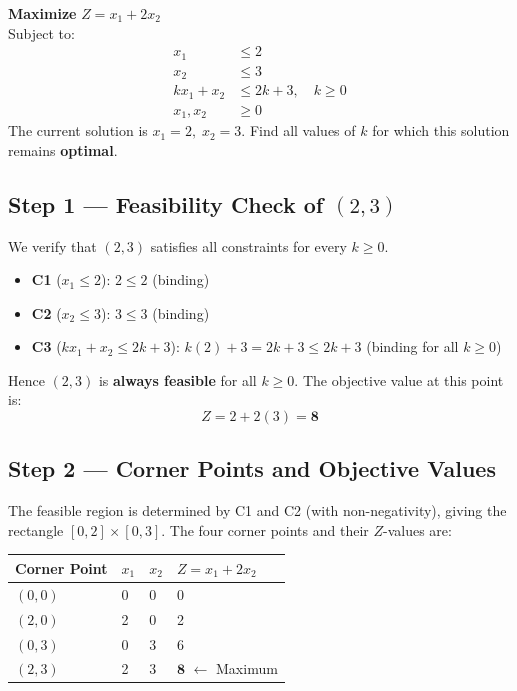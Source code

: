 \documentclass[12pt]{article}
\newcommand{\hcell}[1]{\textbf{\color{white}#1}}
\begin{document}
\begin{problembox}
\textbf{Maximize} $Z = x_1 + 2x_2$\\[4pt]
Subject to:
\begin{align*}
  x_1 &\leq 2 \tag{C1}\\
  x_2 &\leq 3 \tag{C2}\\
  kx_1 + x_2 &\leq 2k + 3, \quad k \geq 0 \tag{C3}\\
  x_1, x_2 &\geq 0
\end{align*}
The current solution is $x_1 = 2,\; x_2 = 3$.
Find all values of $k$ for which this solution remains \textbf{optimal}.
\end{problembox}

\subsection*{Step 1 --- Feasibility Check of $(2,3)$}

\begin{conceptbox}
We verify that $(2,3)$ satisfies all constraints for every $k \geq 0$.
\end{conceptbox}

\begin{itemize}[noitemsep, topsep=4pt]
  \item \textbf{C1} ($x_1 \leq 2$): $2 \leq 2$ \quad\checkmark\quad (binding)
  \item \textbf{C2} ($x_2 \leq 3$): $3 \leq 3$ \quad\checkmark\quad (binding)
  \item \textbf{C3} ($kx_1 + x_2 \leq 2k+3$): $k(2)+3 = 2k+3 \leq 2k+3$ \quad\checkmark\quad (binding for all $k \geq 0$)
\end{itemize}

Hence $(2,3)$ is \textbf{always feasible} for all $k \geq 0$.
The objective value at this point is:
\[
  Z = 2 + 2(3) = \mathbf{8}
\]

\subsection*{Step 2 --- Corner Points and Objective Values}

The feasible region is determined by C1 and C2 (with non-negativity), giving the rectangle
$[0,2]\times[0,3]$.  The four corner points and their $Z$-values are:

\begin{center}
\begin{tabular}{C{2.8cm} C{1.6cm} C{1.6cm} C{3.2cm}}
\toprule
{}
\hcell{Corner Point} & \hcell{$x_1$} & \hcell{$x_2$} & \hcell{$Z = x_1 + 2x_2$} \\
\midrule
{}
$(0,0)$ & 0 & 0 & 0 \\
$(2,0)$ & 2 & 0 & 2 \\
$(0,3)$ & 0 & 3 & 6 \\
$(2,3)$ & 2 & 3 & $\mathbf{8}$ \quad $\leftarrow$ Maximum \\
\bottomrule
\end{tabular}
\end{center}
\end{document}

